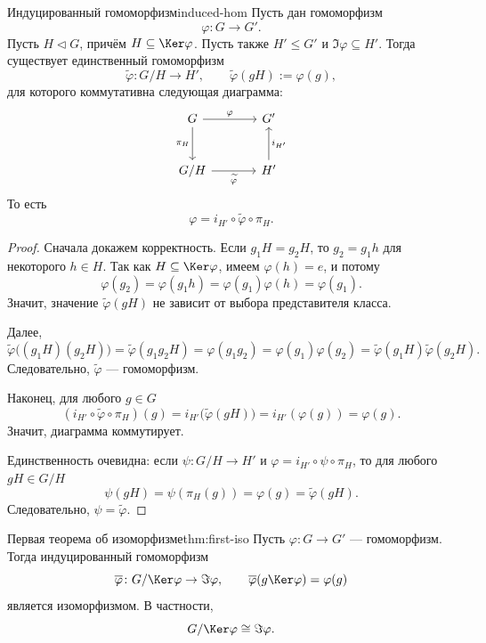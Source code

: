 \begin{Theorem}{Индуцированный гомоморфизм}{induced-hom}
	Пусть дан гомоморфизм
	\[
	\varphi\colon G\to G'.
	\]
	Пусть $H\triangleleft G$, причём $H\subseteq \Ker\varphi$. Пусть также $H'\le G'$ и $\Im\varphi\subseteq H'$. Тогда существует единственный гомоморфизм
	\[
	\widetilde\varphi\colon G/H\to H', \qquad \widetilde\varphi(gH):=\varphi(g),
	\]
	для которого коммутативна следующая диаграмма:
	\[
	\begin{tikzcd}[column sep=large, row sep=large]
		G \arrow[r, "\varphi"] \arrow[d, "\pi_H"'] & G' \\
		G/H \arrow[r, "\widetilde{\varphi}"'] & H' \arrow[u, "i_{H'}"']
	\end{tikzcd}
	\]
	То есть
	\[
	\varphi = i_{H'}\circ \widetilde\varphi\circ \pi_H.
	\]
\end{Theorem}

\begin{proof}
	Сначала докажем корректность. Если $g_1H=g_2H$, то $g_2=g_1h$ для некоторого $h\in H$. Так как $H\subseteq \Ker\varphi$, имеем $\varphi(h)=e$, и потому
	\[
	\varphi(g_2)=\varphi(g_1h)=\varphi(g_1)\varphi(h)=\varphi(g_1).
	\]
	Значит, значение $\widetilde\varphi(gH)$ не зависит от выбора представителя класса.
	
	Далее,
	\[
	\widetilde\varphi\bigl((g_1H)(g_2H)\bigr)=\widetilde\varphi(g_1g_2H)=\varphi(g_1g_2)=\varphi(g_1)\varphi(g_2)=\widetilde\varphi(g_1H)\widetilde\varphi(g_2H).
	\]
	Следовательно, $\widetilde\varphi$ --- гомоморфизм.
	
	Наконец, для любого $g\in G$
	\[
	(i_{H'}\circ \widetilde\varphi\circ \pi_H)(g)=i_{H'}\bigl(\widetilde\varphi(gH)\bigr)=i_{H'}(\varphi(g))=\varphi(g).
	\]
	Значит, диаграмма коммутирует.
	
	Единственность очевидна: если $\psi\colon G/H\to H'$ и $\varphi=i_{H'}\circ\psi\circ\pi_H$, то для любого $gH\in G/H$
	\[
	\psi(gH)=\psi(\pi_H(g))=\varphi(g)=\widetilde\varphi(gH).
	\]
	Следовательно, $\psi=\widetilde\varphi$.
\end{proof}

\begin{Theorem}{Первая теорема об изоморфизме}{thm:first-iso}
	Пусть $\varphi\colon G\to G'$ --- гомоморфизм. Тогда индуцированный гомоморфизм
	\[
	\overline\varphi\colon G/\Ker\varphi \to \Im\varphi,
	\qquad
	\overline\varphi(g\Ker\varphi)=\varphi(g)
	\]
	является изоморфизмом. В частности,
	\[
	G/\Ker\varphi \cong \Im\varphi.
	\]
\end{Theorem}

